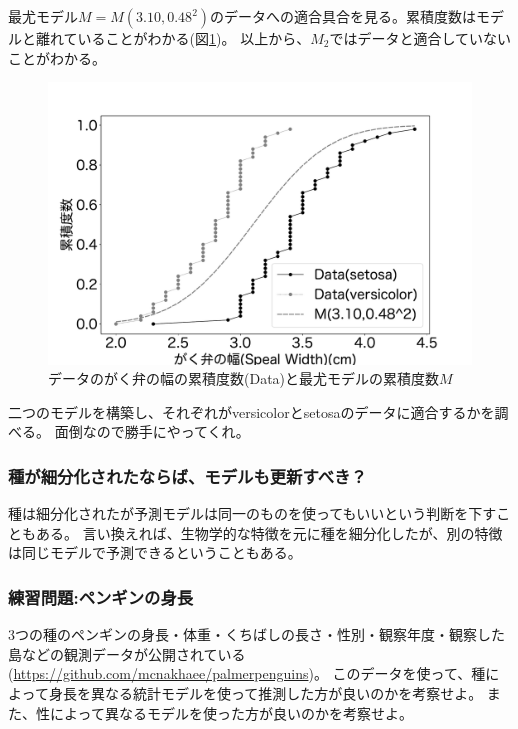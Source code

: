 最尤モデル$M=M(3.10,0.48^2)$のデータへの適合具合を見る。累積度数はモデルと離れていることがわかる(図\ref{fig:speal_width_setosa_versi_model})。
以上から、$M_2$ではデータと適合していないことがわかる。


\begin{figure}
 \begin{center}
  \includegraphics[width=15cm]{./image/15_/speal_width_seto_versi_model.pdf}
  \caption{データのがく弁の幅の累積度数(Data)と最尤モデルの累積度数$M$}
  \label{fig:speal_width_setosa_versi_model}
 \end{center}
\end{figure}


二つのモデルを構築し、それぞれがversicolorとsetosaのデータに適合するかを調べる。
面倒なので勝手にやってくれ。


\subsubsection{種が細分化されたならば、モデルも更新すべき？}
種は細分化されたが予測モデルは同一のものを使ってもいいという判断を下すこともある。
言い換えれば、生物学的な特徴を元に種を細分化したが、別の特徴は同じモデルで予測できるということもある。

\subsubsection{練習問題:ペンギンの身長}
3つの種のペンギンの身長・体重・くちばしの長さ・性別・観察年度・観察した島などの観測データが公開されている(\url{https://github.com/mcnakhaee/palmerpenguins})。
このデータを使って、種によって身長を異なる統計モデルを使って推測した方が良いのかを考察せよ。
また、性によって異なるモデルを使った方が良いのかを考察せよ。

